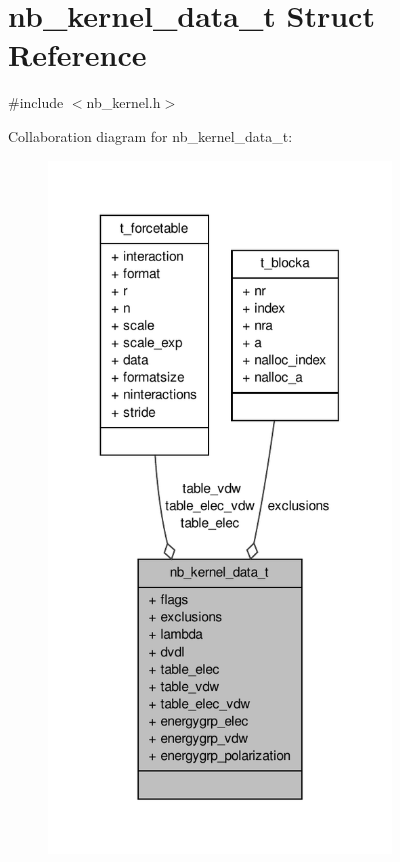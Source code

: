 \hypertarget{structnb__kernel__data__t}{\section{nb\-\_\-kernel\-\_\-data\-\_\-t \-Struct \-Reference}
\label{structnb__kernel__data__t}
}


{\ttfamily \#include $<$nb\-\_\-kernel.\-h$>$}



\-Collaboration diagram for nb\-\_\-kernel\-\_\-data\-\_\-t\-:
\nopagebreak
\begin{figure}[H]
\begin{center}
\leavevmode
\includegraphics[width=258pt]{structnb__kernel__data__t__coll__graph}
\end{center}
\end{figure}
